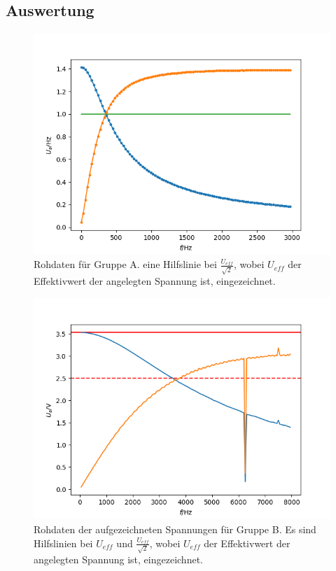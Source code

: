 \documentclass[12pt,a4paper]{article}
\begin{document}
\subsection{Auswertung}

\begin{figure}
\centering
\includegraphics[scale=1.0]{Bilder/RohdatenHochTief_A.png}
\caption{Rohdaten für Gruppe A. eine Hilfslinie bei $\frac{U_{eff}}{\sqrt{2}}$, wobei $U_{eff}$ der Effektivwert der angelegten Spannung ist, eingezeichnet.}
\label{fig:RohdatenHochTief_A}
\end{figure}

\begin{figure}
\centering
\includegraphics[scale=1.0]{Bilder/RohdatenHochTief_B.png}
\caption{Rohdaten der aufgezeichneten Spannungen für Gruppe B. Es sind Hilfslinien bei $U_{eff}$ und $\frac{U_{eff}}{\sqrt{2}}$, wobei $U_{eff}$ der Effektivwert der angelegten Spannung ist, eingezeichnet.}
\label{fig:RohdatenHochTief_B}
\end{figure}
\end{document}
